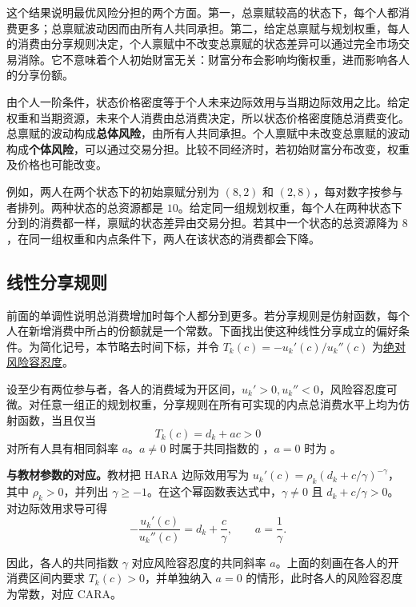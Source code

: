 这个结果说明最优风险分担的两个方面。第一，总禀赋较高的状态下，每个人都消费更多；总禀赋波动因而由所有人共同承担。第二，给定总禀赋与规划权重，每人的消费由分享规则决定，个人禀赋中不改变总禀赋的状态差异可以通过完全市场交易消除。它不意味着个人初始财富无关：财富分布会影响均衡权重，进而影响各人的分享份额。

由个人一阶条件，状态价格密度等于个人未来边际效用与当期边际效用之比。给定权重和当期资源，未来个人消费由总消费决定，所以状态价格密度随总消费变化。总禀赋的波动构成\textbf{总体风险}，由所有人共同承担。个人禀赋中未改变总禀赋的波动构成\textbf{个体风险}，可以通过交易分担。比较不同经济时，若初始财富分布改变，权重及价格也可能改变。

例如，两人在两个状态下的初始禀赋分别为 $(8,2)$ 和 $(2,8)$，每对数字按参与者排列。两种状态的总资源都是 $10$。给定同一组规划权重，每个人在两种状态下分到的消费都一样，禀赋的状态差异由交易分担。若其中一个状态的总资源降为 $8$，在同一组权重和内点条件下，两人在该状态的消费都会下降。

\subsection{线性分享规则}
前面的单调性说明总消费增加时每个人都分到更多。若分享规则是仿射函数，每个人在新增消费中所占的份额就是一个常数。下面找出使这种线性分享成立的偏好条件。为简化记号，本节略去时间下标，并令 $T_k(c)=-u_k'(c)/u_k''(c)$ 为\hyperlink{wj-risk-tolerance}{\textcolor{WJReferenceColor}{绝对风险容忍度}}。
\begin{tcolorbox}[knowledge]
 设至少有两位参与者，各人的消费域为开区间，$u_k'>0,u_k''<0$，风险容忍度可微。对任意一组正的规划权重，分享规则在所有可实现的内点总消费水平上均为仿射函数，当且仅当
\[
 T_k(c)=d_k+a c>0
\]
对所有人具有相同斜率 $a$。$a\ne0$ 时属于共同指数的 ，$a=0$ 时为 。
\end{tcolorbox}

\textbf{与教材参数的对应。}教材把 HARA 边际效用写为 $u_k'(c)=\rho_k(d_k+c/\gamma)^{-\gamma}$，其中 $\rho_k>0$，并列出 $\gamma\ge-1$。在这个幂函数表达式中，$\gamma\ne0$ 且 $d_k+c/\gamma>0$。对边际效用求导可得
\[
 -\frac{u_k'(c)}{u_k''(c)}=d_k+\frac{c}{\gamma},
 \qquad a=\frac1\gamma.
\]

因此，各人的共同指数 $\gamma$ 对应风险容忍度的共同斜率 $a$。上面的刻画在各人的开消费区间内要求 $T_k(c)>0$，并单独纳入 $a=0$ 的情形，此时各人的风险容忍度为常数，对应 CARA。

